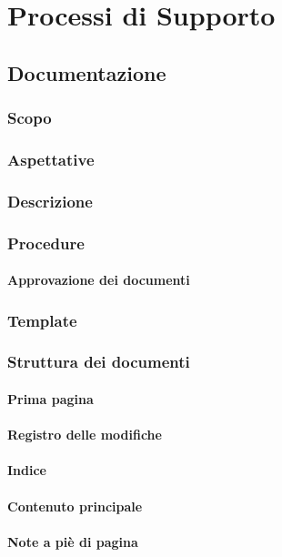 \section{Processi di Supporto}


\subsection{Documentazione}

	\subsubsection{Scopo}
	\subsubsection{Aspettative}
	\subsubsection{Descrizione}
	\subsubsection{Procedure}
		\paragraph{Approvazione dei documenti}
	\subsubsection{Template}
	\subsubsection{Struttura dei documenti}
		\paragraph{Prima pagina}
		\paragraph{Registro delle modifiche}
		\paragraph{Indice}
		\paragraph{Contenuto principale}
		\paragraph{Note a piè di pagina}
